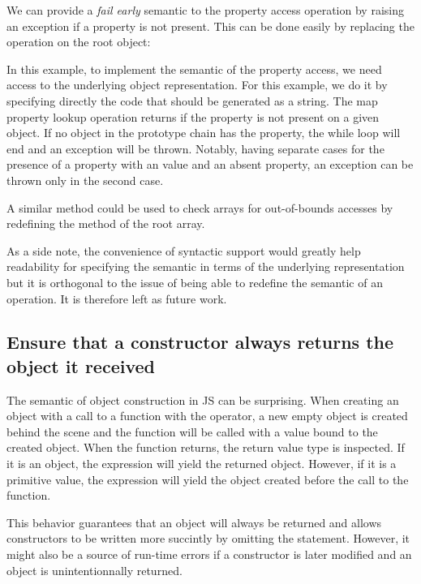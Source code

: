 We can provide a \textit{fail early} semantic to the property access operation
by raising an exception if a property is not present. This can be done easily 
by replacing the  operation on the root object:


In this example, to implement the semantic of the property access, we need
access to the underlying object representation. For this example, we do it by
specifying directly the code that should be generated as a string. The map
property lookup operation returns  if the property is not present
on a given object. If no object in the prototype chain has the property, the
while loop will end and an exception will be thrown.  Notably, having separate
cases for the presence of a property with an  value and an absent
property, an exception can be thrown only in the second case.

A similar method could be used to check arrays for out-of-bounds accesses by redefining
the  method of the root array.

As a side note, the convenience of syntactic support would greatly help
readability for specifying the semantic in terms of the underlying
representation but it is orthogonal to the issue of being able to redefine the
semantic of an operation. It is therefore left as future work.

\subsection{Ensure that a constructor always returns the object it received}

The semantic of object construction in JS can be surprising. When creating an
object with a call to a function with the  operator, a new empty object
is created behind the scene and the function will be called with a 
value bound to the created object. When the function returns, the return value type 
is inspected. If it is an object, the  expression will yield the
returned object. However, if it is a primitive value, the  expression
will yield the object created before the call to the function.

This behavior guarantees that an object will always be returned and allows
constructors to be written more succintly by omitting the 
statement. However, it might also be a source of run-time errors if a
constructor is later modified and an object is unintentionnally returned.

